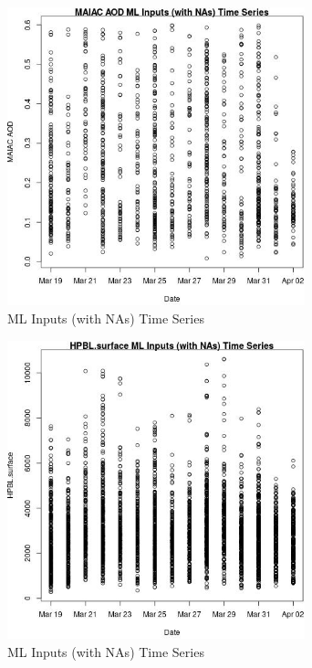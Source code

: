 \begin{figure} 
\centering  
\includegraphics[width=0.77\textwidth]{Code_Outputs/Report_ML_input_PM25_Step4_part_e_de_duplicated_aveswNAs_MAIAC_AODvDate.jpg} 
\caption{\label{fig:Report_ML_input_PM25_Step4_part_e_de_duplicated_aveswNAsMAIAC_AODvDate}ML Inputs (with NAs) Time Series} 
\end{figure} 
 

\begin{figure} 
\centering  
\includegraphics[width=0.77\textwidth]{Code_Outputs/Report_ML_input_PM25_Step4_part_e_de_duplicated_aveswNAs_HPBLsurfacevDate.jpg} 
\caption{\label{fig:Report_ML_input_PM25_Step4_part_e_de_duplicated_aveswNAsHPBLsurfacevDate}ML Inputs (with NAs) Time Series} 
\end{figure} 
 

